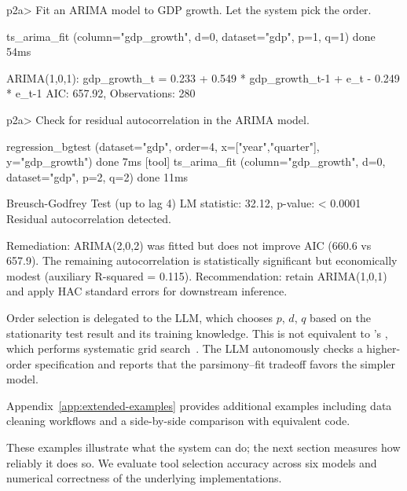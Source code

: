 \begin{Sinput}
p2a> Fit an ARIMA model to GDP growth. Let the system pick the order.
\end{Sinput}

\begin{Soutput}
  [tool] ts_arima_fit (column="gdp_growth", d=0, dataset="gdp",
           p=1, q=1)                                                done 54ms

ARIMA(1,0,1): gdp_growth_t = 0.233 + 0.549 * gdp_growth_{t-1}
              + e_t - 0.249 * e_{t-1}
AIC: 657.92,  Observations: 280
\end{Soutput}

\begin{Sinput}
p2a> Check for residual autocorrelation in the ARIMA model.
\end{Sinput}

\begin{Soutput}
  [tool] regression_bgtest (dataset="gdp", order=4,
           x=["year","quarter"], y="gdp_growth")                    done 7ms
  [tool] ts_arima_fit (column="gdp_growth", d=0, dataset="gdp",
           p=2, q=2)                                                done 11ms

Breusch-Godfrey Test (up to lag 4)
LM statistic: 32.12,  p-value: < 0.0001
Residual autocorrelation detected.

Remediation: ARIMA(2,0,2) was fitted but does not improve AIC
(660.6 vs 657.9). The remaining autocorrelation is statistically
significant but economically modest (auxiliary R-squared = 0.115).
Recommendation: retain ARIMA(1,0,1) and apply HAC standard errors
for downstream inference.
\end{Soutput}

\noindent Order selection is delegated to the LLM, which chooses
$p$, $d$, $q$ based on the stationarity test result and its training
knowledge. This is not equivalent to 's ,
which performs systematic grid
search~\citep{Hyndman+Khandakar:2008}. The LLM autonomously checks a
higher-order specification and reports that the parsimony--fit tradeoff
favors the simpler model.

Appendix~\ref{app:extended-examples} provides additional examples
including data cleaning workflows and a side-by-side comparison with
equivalent  code.

These examples illustrate what the system can do; the next section
measures how reliably it does so. We evaluate tool selection accuracy
across six models and numerical correctness of the underlying
 implementations.
